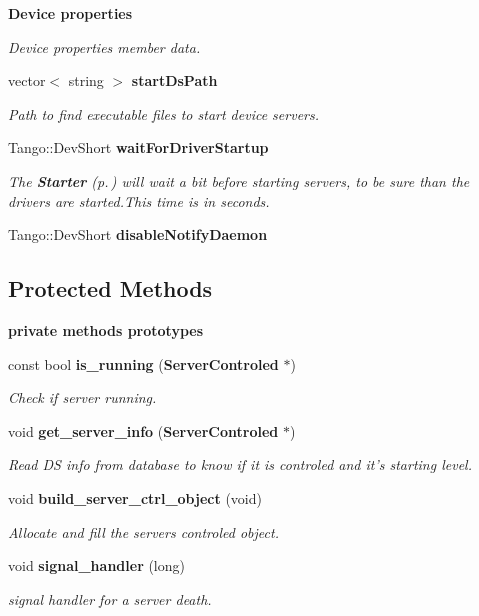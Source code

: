 \begin{Indent}{\bf Device properties}\par
{\em Device properties member data.}\begin{CompactItemize}
\item 
vector$<$ string $>$ {\bf start\-Ds\-Path}
\begin{CompactList}\small\item\em Path to find executable files to start device servers.\item\end{CompactList}\item 
Tango::Dev\-Short {\bf wait\-For\-Driver\-Startup}
\begin{CompactList}\small\item\em The {\bf Starter} {\rm (p.\,\pageref{classStarter_1_1Starter})} will wait a bit before starting servers, to be sure than the drivers are started.This time is in seconds.\item\end{CompactList}\item 
Tango::Dev\-Short {\bf disable\-Notify\-Daemon}
\end{CompactItemize}
\end{Indent}
\subsection*{Protected Methods}
\begin{Indent}{\bf private methods prototypes}\par
\begin{CompactItemize}
\item 
const bool {\bf is\_\-running} ({\bf Server\-Controled} $\ast$)
\begin{CompactList}\small\item\em Check if server running.\item\end{CompactList}\item 
void {\bf get\_\-server\_\-info} ({\bf Server\-Controled} $\ast$)
\begin{CompactList}\small\item\em Read DS info from database to know if it is controled and it's starting level.\item\end{CompactList}\item 
void {\bf build\_\-server\_\-ctrl\_\-object} (void)
\begin{CompactList}\small\item\em Allocate and fill the servers controled object.\item\end{CompactList}\item 
void {\bf signal\_\-handler} (long)
\begin{CompactList}\small\item\em signal handler for a server death.\item\end{CompactList}\end{CompactItemize}
\end{Indent}



